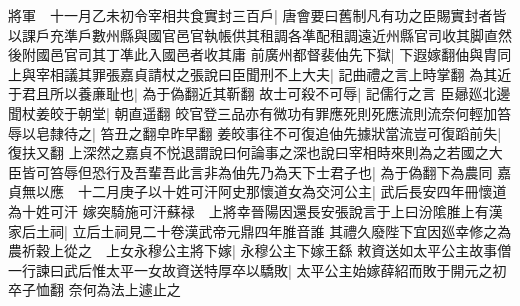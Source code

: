 將軍　十一月乙未初令宰相共食實封三百戶|{
	唐會要曰舊制凡有功之臣賜實封者皆以課戶充準戶數州縣與國官邑官執帳供其租調各凖配租調遠近州縣官司收其脚直然後附國邑官司其丁凖此入國邑者收其庸}
前廣州都督裴伷先下獄|{
	下遐嫁翻伷與胄同}
上與宰相議其罪張嘉貞請杖之張說曰臣聞刑不上大夫|{
	記曲禮之言上時掌翻}
為其近于君且所以養亷耻也|{
	為于偽翻近其靳翻}
故士可殺不可辱|{
	記儒行之言}
臣曏廵北邊聞杖姜皎于朝堂|{
	朝直遥翻}
皎官登三品亦有微功有罪應死則死應流則流奈何輕加笞辱以皂隸待之|{
	笞丑之翻皁昨早翻}
姜皎事往不可復追伷先據狀當流豈可復蹈前失|{
	復扶又翻}
上深然之嘉貞不悦退謂說曰何論事之深也說曰宰相時來則為之若國之大臣皆可笞辱但恐行及吾輩吾此言非為伷先乃為天下士君子也|{
	為于偽翻下為農同}
嘉貞無以應　十二月庚子以十姓可汗阿史那懷道女為交河公主|{
	武后長安四年冊懷道為十姓可汗}
嫁突騎施可汗蘇禄　上將幸晉陽因還長安張說言于上曰汾隂脽上有漢家后土祠|{
	立后土祠見二十卷漢武帝元鼎四年脽音誰}
其禮久廢陛下宜因廵幸修之為農祈穀上從之　上女永穆公主將下嫁|{
	永穆公主下嫁王繇}
敕資送如太平公主故事僧一行諫曰武后惟太平一女故資送特厚卒以驕敗|{
	太平公主始嫁薛紹而敗于開元之初卒子恤翻}
奈何為法上遽止之

